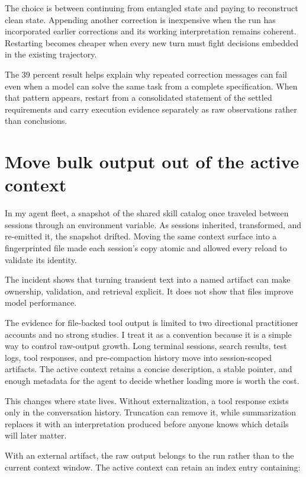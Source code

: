 The choice is between continuing from entangled state and paying to reconstruct clean state. Appending another correction is inexpensive when the run has incorporated earlier corrections and its working interpretation remains coherent. Restarting becomes cheaper when every new turn must fight decisions embedded in the existing trajectory.

The 39 percent result helps explain why repeated correction messages can fail even when a model can solve the same task from a complete specification. When that pattern appears, restart from a consolidated statement of the settled requirements and carry execution evidence separately as raw observations rather than conclusions.

\section{Move bulk output out of the active context}\label{move-bulk-output-out-of-the-active-context}

In my agent fleet, a snapshot of the shared skill catalog once traveled between sessions through an environment variable. As sessions inherited, transformed, and re-emitted it, the snapshot drifted. Moving the same context surface into a fingerprinted file made each session's copy atomic and allowed every reload to validate its identity.

The incident shows that turning transient text into a named artifact can make ownership, validation, and retrieval explicit. It does not show that files improve model performance.

The evidence for file-backed tool output is limited to two directional practitioner accounts and no strong studies. I treat it as a convention because it is a simple way to control raw-output growth. Long terminal sessions, search results, test logs, tool responses, and pre-compaction history move into session-scoped artifacts. The active context retains a concise description, a stable pointer, and enough metadata for the agent to decide whether loading more is worth the cost.

This changes where state lives. Without externalization, a tool response exists only in the conversation history. Truncation can remove it, while summarization replaces it with an interpretation produced before anyone knows which details will later matter.

With an external artifact, the raw output belongs to the run rather than to the current context window. The active context can retain an index entry containing:

